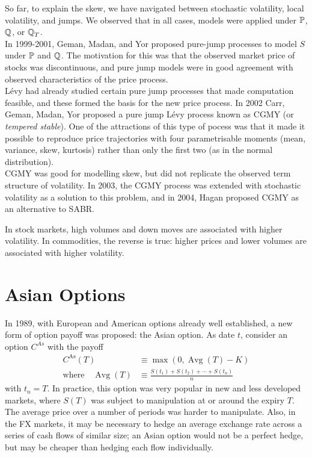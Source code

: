 \documentclass[11pt]{article}
\begin{document}
So far, to explain the skew, we have navigated between stochastic volatility, local volatility, and jumps. We observed that in all cases, models were applied under $\operatorname{\mathbb P}$, $\operatorname{\mathbb Q}$, or $\operatorname{\mathbb Q}_T$. \\

In 1999-2001, Geman, Madan, and Yor proposed pure-jump processes to model $S$ under $\operatorname{\mathbb P}$ and $\operatorname{\mathbb Q}$. The motivation for this was that the observed market price of  stocks was discontinuous, and pure jump models were in good agreement with observed characteristics of the price process. \\

Lévy had already studied certain pure jump processes that made computation feasible, and these formed the basis for the new price process. In 2002 Carr, Geman, Madan, Yor proposed a pure jump Lévy process known as CGMY (or {\em tempered stable}). One of the attractions of this type of pocess was that it made it possible to reproduce price trajectories with four parametrisable moments (mean, variance, skew, kurtosis) rather than only the first two (as in the normal distribution). \\

CGMY was good for modelling skew, but did not replicate the observed term structure of volatility. In 2003, the CGMY process was extended with stochastic volatility as a solution to this problem, and in 2004, Hagan proposed CGMY as an alternative to SABR. \\

\begin{remark}
In stock markets, high volumes and down moves are associated with higher volatility. In commodities, the reverse is true: higher prices and lower volumes are associated with higher volatility.
\end{remark}

\section{Asian Options}
In 1989, with European and American options already well established, a new form of option payoff was proposed: the Asian option. As date $t$, consider an option $C^{As}$ with the payoff
\begin{align*}
C^{\text{As}}(T) &\equiv \max \left( 0, \operatorname{Avg}(T) - K\right) \\
\text{where} \quad \operatorname{Avg}(T) &\equiv \frac{S(t_1) + S(t_2) + \cdots + S(t_n)}{n}
\end{align*}
with $t_n = T$. In practice, this option was very popular in new and less developed markets, where $S(T)$ was subject to manipulation at or around the expiry $T$. The average price over a number of periods was harder to manipulate. Also, in the FX markets, it may be necessary to hedge an average exchange rate across a series of cash flows of similar size; an Asian option would not be a perfect hedge, but may be cheaper than hedging each flow individually. \\
\end{document}
